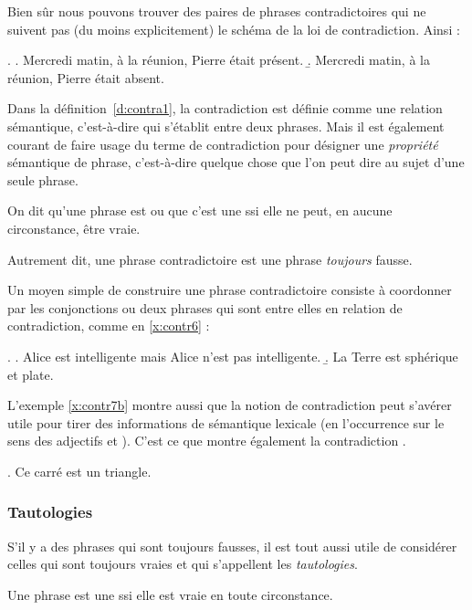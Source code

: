 \begin{refsegment}
Bien sûr nous pouvons trouver des paires de phrases contradictoires qui ne
suivent pas (du moins explicitement) le schéma de la loi de
contradiction. Ainsi :

\ex.
\a. Mercredi matin, à la réunion, Pierre était présent.
\b. Mercredi matin, à la réunion, Pierre était absent.


\largerpage

Dans la définition~\ref{d:contra1}, la contradiction est définie comme
une relation sémantique, c'est-à-dire qui s'établit entre deux
phrases.  Mais il est également courant de faire usage du terme de
contradiction pour désigner une  \emph{propriété} sémantique de phrase, c'est-à-dire
quelque chose que l'on peut dire au sujet d'une seule phrase.  

\begin{defi}
On dit qu'une phrase est  ou que c'est une
 ssi elle  ne peut, en aucune circonstance,
être vraie.  
\end{defi}

Autrement dit, une phrase contradictoire est une phrase \emph{toujours} fausse.

Un moyen simple de construire une phrase contradictoire consiste à
coordonner par les
conjonctions  ou  deux phrases qui sont entre
elles en relation de contradiction, comme en \ref{x:contr6} : 


\ex.  \label{x:contr6}
\a. Alice est intelligente mais Alice n'est pas intelligente.
\b. La Terre est sphérique et  plate.
 \label{x:contr7b}


L'exemple \ref{x:contr7b} montre aussi que la notion de contradiction peut s'avérer utile pour tirer des informations de sémantique lexicale
(en l'occurrence sur le sens des adjectifs  et ).  
C'est ce que montre également la contradiction \Next.


\ex.
Ce carré est un triangle.




\subsubsection{Tautologies}

S'il y a des phrases qui sont toujours fausses, il est tout aussi 
utile de considérer celles qui sont toujours vraies et qui s'appellent les \emph{tautologies}.


\begin{defi}[Tautologie]
Une phrase est une   ssi elle est vraie en toute
circonstance. 
\end{defi}


\end{refsegment}
